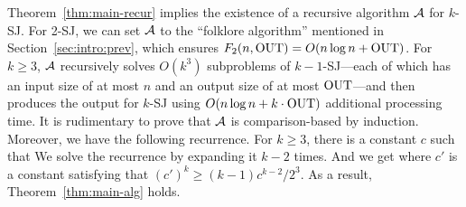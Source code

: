 
Theorem~\ref{thm:main-recur} implies the existence of a recursive algorithm $\mathcal{A}$ for $k$-SJ. For 2-SJ, we can set $\mathcal{A}$ to the ``folklore algorithm'' mentioned in Section~\ref{sec:intro:prev}, which ensures $F_2(n, \mathrm{OUT}) = O(n \log n + \mathrm{OUT})$. For $k \geq 3$, $\mathcal{A}$ recursively solves $O(k^3)$ subproblems of $k-1$-SJ---each of which has an input size of at most $n$ and an output size of at most $\mathrm{OUT}$---and then produces the output for $k$-SJ using $O(n\log n + k\cdot \mathrm{OUT})$ additional processing
time. It is rudimentary to prove that $\mathcal{A}$ is comparison-based by induction.
Moreover, we have the following recurrence.
For $k \geq 3$, there is a constant $c$ such that
We solve the recurrence by expanding it $k-2$ times. And we get
where $c'$ is a constant satisfying that $(c')^k \geq (k-1)c^{k-2}/2^3$. 
As a result, Theorem~\ref{thm:main-alg} holds. 
